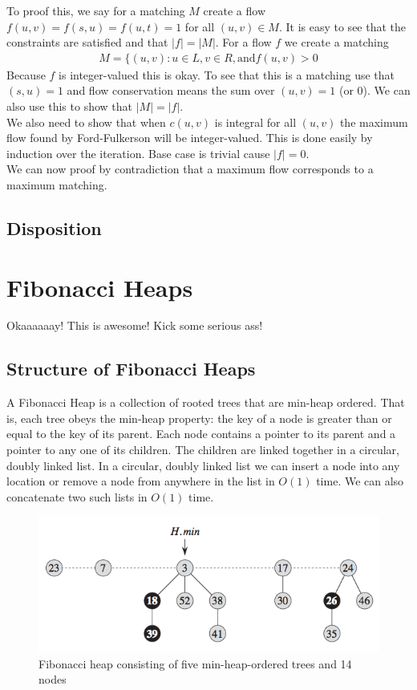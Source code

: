 \documentclass[12pt]{article}
\begin{document}
To proof this, we say for a matching $M$ create a flow $f(u, v) = f(s, u) = f(u, t) = 1$ for all $(u, v) \in M$. It is easy to see that the constraints are satisfied and that $|f| = |M|$. For a flow $f$ we create a matching
\begin{align*}
	M = \{(u, v) : u \in L, v \in R, \text{and} f(u, v) > 0 
\end{align*}
Because $f$ is integer-valued this is okay. To see that this is a matching use that $(s, u) = 1$ and flow conservation means the sum over $(u, v) = 1$ (or $0$). We can also use this to show that $|M| = |f|$. \\

We also need to show that when $c(u, v)$ is integral for all $(u, v)$ the maximum flow found by Ford-Fulkerson will be integer-valued. This is done easily by induction over the iteration. Base case is trivial cause $|f| = 0$.\\

We can now proof by contradiction that a maximum flow corresponds to a maximum matching.

\subsection{Disposition}
\newpage

\section{Fibonacci Heaps}
Okaaaaaay! This is awesome! Kick some serious ass!

\subsection{Structure of Fibonacci Heaps}
A Fibonacci Heap is a collection of rooted trees that are min-heap ordered. That is, each tree obeys the min-heap property: the key of a node is greater than or equal to the key of its parent. Each node contains a pointer to its parent and a pointer to any one of its children. The children are linked together in a circular, doubly linked list. In a circular, doubly linked list we can insert a node into any location or remove a node from anywhere in the list in $O(1)$ time. We can also concatenate two such lists in $O(1)$ time.
\begin{figure} [H]
    \begin{center}
        \includegraphics[width=\textwidth]{Images/Hmin.png}
        \caption{Fibonacci heap consisting of five min-heap-ordered trees and 14 nodes}
        \label{fig:H.min}
    \end{center}
\end{figure}
\end{document}
